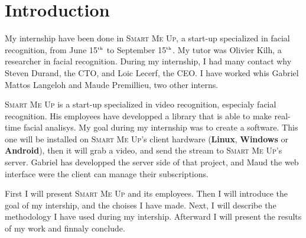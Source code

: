 \documentclass[a4paper,11pt]{custom}
\newcommand{\smu}{\textsc{Smart Me Up}}
\newcommand{\linux}{\textbf{Linux}}
\newcommand{\win}{\textbf{Windows}}
\newcommand{\android}{\textbf{Android}}
\newcommand{\nth}[1]{#1$^{\text{\tiny th}}$}
\begin{document}


\chapter{Introduction}

My internship have been done in \smu, a start-up specialized in facial
recognition, from June \nth{15} to September \nth{15}. My tutor was Olivier
Kilh, a researcher in facial recognition. During my internship, I had many
contact why Steven Durand, the CTO, and Loic Lecerf, the CEO. I have worked whis
Gabriel Mattos Langeloh and Maude Premillieu, two other interns.

\smu{} is a start-up specialized in video recognition, especialy facial
recognition. His employees have developped a library that is able to make
real-time facial analisys. My goal during my internship was to create a
software. This one will be installed on \smu's client hardware (\linux, \win{}
or \android), then it will grab a video, and send the stream to \smu's server.
Gabriel has developped the server side of that project, and Maud the web
interface were the client can manage their subscriptions.

First I will present \smu{} and its employees. Then I will introduce the goal of
my intership, and the choises I have made. Next, I will describe the
methodology I have used during my intership. Afterward I will present the
results of my work and finnaly conclude.

\vspace{\fill}
\end{document}

